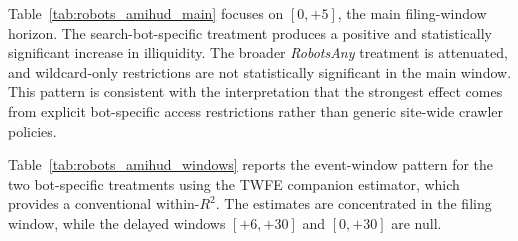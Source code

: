 \documentclass[11pt]{article}
\begin{document}
Table~\ref{tab:robots_amihud_main} focuses on \([0,+5]\), the main
filing-window horizon.  The search-bot-specific treatment produces a
positive and statistically significant increase in illiquidity.  The
broader \textit{RobotsAny} treatment is attenuated, and wildcard-only
restrictions are not statistically significant in the main window.  This
pattern is consistent with the interpretation that the strongest effect
comes from explicit bot-specific access restrictions rather than generic
site-wide crawler policies.

Table~\ref{tab:robots_amihud_windows} reports the event-window pattern
for the two bot-specific treatments using the TWFE companion estimator,
which provides a conventional within-\(R^2\).  The estimates are
concentrated in the filing window, while the delayed windows
\([+6,+30]\) and \([0,+30]\) are null.
\end{document}
